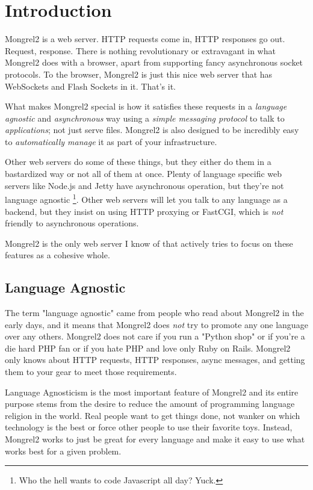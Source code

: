 \chapter{Introduction}

Mongrel2 is a web server.  HTTP requests come in, HTTP responses go out.
Request, response.  There is nothing revolutionary or extravagant in what
Mongrel2 does with a browser, apart from supporting fancy asynchronous socket
protocols.  To the browser, Mongrel2 is just this nice web server that has
WebSockets and Flash Sockets in it.  That's it.

What makes Mongrel2 special is how it satisfies these requests in a \emph{
language agnostic} and \emph{asynchronous} way using a \emph{simple messaging
protocol} to talk to \emph{applications}; not just serve files.  Mongrel2 is also
designed to be incredibly easy to \emph{automatically manage} it as part of your
infrastructure.

Other web servers do some of these things, but they either do them in a bastardized
way or not all of them at once.  Plenty of language specific web servers like Node.js
and Jetty have asynchronous operation, but they're not language agnostic
\footnote{Who the hell wants to code Javascript all day?  Yuck.}.  Other web servers
will let you talk to any language as a backend, but they insist on using HTTP
proxying or FastCGI, which is \emph{not} friendly to asynchronous operations.

Mongrel2 is the only web server I know of that actively tries to focus on these
features as a cohesive whole.


\section{Language Agnostic}

The term "language agnostic" came from people who read about Mongrel2 in the
early days, and it means that Mongrel2 does \emph{not} try to promote any one
language over any others.  Mongrel2 does not care if you run a "Python shop" or
if you're a die hard PHP fan or if you hate PHP and love only Ruby on Rails.
Mongrel2 only knows about HTTP requests, HTTP responses, async messages, and
getting them to your gear to meet those requirements.

Language Agnosticism is the most important feature of Mongrel2 and its entire
purpose stems from the desire to reduce the amount of programming language
religion in the world.  Real people want to get things done, not wanker on
which technology is the best or force other people to use their favorite toys.
Instead, Mongrel2 works to just be great for every language and make it easy
to use what works best for a given problem.


